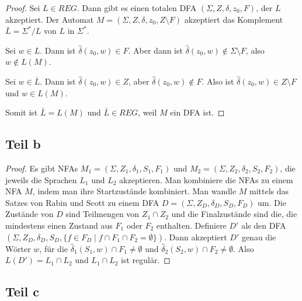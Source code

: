 \documentclass[10pt,a4paper]{article}
\begin{document}
\begin{proof}
  Sei $L \in REG$.
  Dann gibt es einen totalen DFA $(\Sigma, Z, \delta, z_{0}, F)$, der $L$ akzeptiert.
  Der Automat $M = (\Sigma, Z, \delta, z_{0}, Z \setminus F)$ akzeptiert das Komplement $\bar{L} = \Sigma^{*} / L$ von $L$ in $\Sigma^{*}$.

  Sei $w \in L$.
  Dann ist $\hat{\delta}(z_{0}, w) \in F$.
  Aber dann ist $\hat{\delta}(z_{0}, w) \not\in \Sigma \setminus F$, also $w \not\in L(M)$.

  Sei $w \in \bar{L}$.
  Dann ist $\hat{\delta}(z_{0}, w) \in Z$, aber $\hat{\delta}(z_{0}, w) \not\in F$.
  Also ist $\hat{\delta}(z_{0}, w) \in Z \setminus F$ und $w \in L(M)$.

  Somit ist $\bar{L} = L(M)$ und $\bar{L} \in REG$, weil $M$ ein DFA ist.
\end{proof}

\subsection{Teil b}

\begin{proof}
  Es gibt NFAs $M_{1} = (\Sigma, Z_{1}, \delta_{1}, S_{1}, F_{1})$ und $M_{2} = (\Sigma, Z_{2}, \delta_{2}, S_{2}, F_{2})$, die jeweils die Sprachen $L_{1}$ und $L_{2}$ akzeptieren.
  Man kombiniere die NFAs zu einem NFA $M$, indem man ihre Startzustände kombiniert.
  Man wandle $M$ mittels das Satzes von Rabin und Scott zu einem DFA $D = (\Sigma, Z_{D}, \delta_{D}, S_{D}, F_{D})$ um.
  Die Zustände von $D$ sind Teilmengen von $Z_{1} \cap Z_{2}$ und die Finalzustände sind die, die mindestens einen Zustand aus $F_{1}$ oder $F_{2}$ enthalten.
  Definiere $D'$ als den DFA $(\Sigma, Z_{D}, \delta_{D}, S_{D}, \{ f \in F_{D} \mid f \cap F_{1} \cap F_{2} = \emptyset \})$.
  Dann akzeptiert $D'$ genau die Wörter $w$, für die $\hat{\delta}_{1}(S_{1}, w) \cap F_{1} \ne \emptyset$ und $\hat{\delta}_{2}(S_{2}, w) \cap F_{2} \ne \emptyset$.
  Also $L(D') = L_{1} \cap L_{2}$ und $L_{1} \cap L_{2}$ ist regulär.
\end{proof}

\subsection{Teil c}
\end{document}
